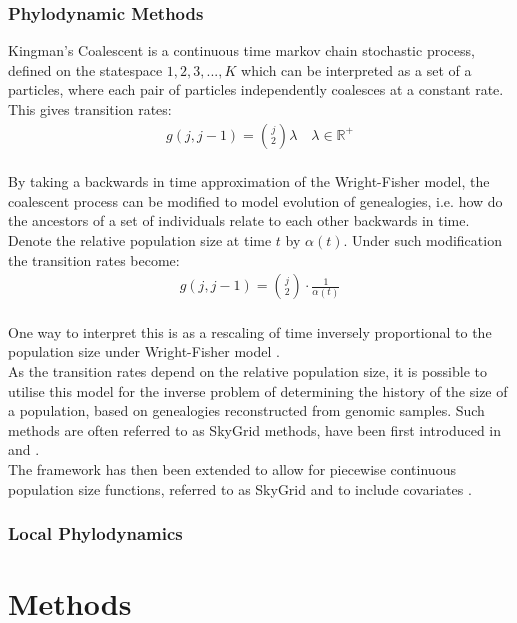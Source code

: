 \documentclass{report}
\newcommand{\R}{\mathbb{R}}
\theoremstyle{definition}
\begin{document}
\subsection{Phylodynamic Methods}
Kingman's Coalescent is a continuous time markov chain stochastic process, defined on the statespace ${1,2,3, ... ,K}$ which can be interpreted as a set of a particles, where each pair of particles independently coalesces at a constant rate. This gives transition rates:
\begin{gather}
g(j, j-1) = \binom{j}{2}\lambda\quad\lambda\in\R^+
\end{gather}
\cite{kingman_coalescent_1982}\\
By taking a backwards in time approximation of the Wright-Fisher model, the coalescent process can be modified to model evolution of genealogies, i.e. how do the ancestors of a set of individuals relate to each other backwards in time. Denote the relative population size at time $t$ by $\alpha(t)$. Under such modification the transition rates become:
\begin{gather}
g(j, j-1) = \binom{j}{2}\cdot\frac{1}{\alpha(t)}
\end{gather}
\cite{griffiths_sampling_1994}\\
One way to interpret this is as a rescaling of time inversely proportional to the population size under Wright-Fisher model \cite{hein_gene_2004}.\\
As the transition rates depend on the relative population size, it is possible to utilise this model for the inverse problem of determining the history of the size of a population, based on genealogies reconstructed from genomic samples.
Such methods are often referred to as SkyGrid methods, have been first introduced in \cite{pybus_integrated_2000} and \cite{drummond_estimating_2002}.\\
The framework has then been extended to allow for piecewise continuous population size functions, referred to as SkyGrid \cite{gill_improving_2013} and to include covariates \cite{gill_understanding_2016}.
\subsection{Local Phylodynamics}

\chapter{Methods}
\end{document}
